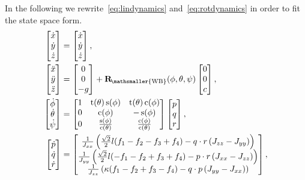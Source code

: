 \documentclass[10pt,a4paper,fleqn]{article}
\newcommand{\ssin}[0]{\operatorname{s}}
\newcommand{\scos}[0]{\operatorname{c}}
\newcommand{\stan}[0]{\operatorname{t}}
\newcommand{\bVec}[1]{\mathbf{#1}}
\newcommand{\wfr}[0]{\ensuremath{W}} %
\newcommand{\bfr}[0]{\ensuremath{B}} %
\newcommand{\ori}[1]{\bVec{R}_{\!\mathsmaller{\mathrm{#1}}}} %
\begin{document}
%
In the following we rewrite~\eqref{eq:lindynamics} and~\eqref{eq:rotdynamics} in order to fit the state space form. 
%
\begin{align}
\begin{bmatrix} 
	\dot{x} \\\dot{y} \\\dot{z} 
\end{bmatrix}
	&= \begin{bmatrix} 
	\dot{x} \\\dot{y} \\\dot{z} 
\end{bmatrix}, \\
%
\begin{bmatrix} 
	\ddot{x} \\\ddot{y} \\\ddot{z} 
\end{bmatrix}
	&= \begin{bmatrix} 0\\ 0\\ -g\end{bmatrix} + \ori{\wfr \bfr}(\phi, \theta, \psi) \begin{bmatrix} 0\\ 0\\ c \end{bmatrix},	\\
%
\begin{bmatrix}
	\dot{\phi} \\ \dot{\theta} \\ \dot{\psi} 
\end{bmatrix} 
 &=
\begin{bmatrix} 1 & \stan(\theta)\ssin(\phi) & \stan(\theta)\scos(\phi) \\ 
0 & \scos(\phi) & -\ssin(\phi) 
\\ 0 & \frac{\ssin(\phi)}{\scos(\theta)}  & \frac{\scos(\phi)}{\scos(\theta)} \end{bmatrix}    
\begin{bmatrix}
	p \\ q \\ r 
\end{bmatrix}, \label{eq:euleranglerates} \\
%
\begin{bmatrix} 
	\dot{p} \\\dot{q} \\\dot{r} 
\end{bmatrix}
	&= 
\begin{bmatrix} 
	\frac{1}{J_{xx}}
		\left( 
			\frac{\sqrt{2}}{2}l(f_1-f_2-f_3+f_4) 
			- q \cdot r \left( J_{zz} - J_{yy} \right)
		\right) \\
	\frac{1}{J_{yy}}
		\left( 
			\frac{\sqrt{2}}{2}l(-f_1-f_2+f_3+f_4)	
			- p \cdot r \left( J_{xx} - J_{zz} \right) 
		\right) \\
	\frac{1}{J_{zz}}
		\left( 
			\kappa(f_1-f_2+f_3-f_4)
			- q \cdot p \left( J_{yy} - J_{xx} \right)		 
		\right) \\
\end{bmatrix} ,
\end{align}
\end{document}

